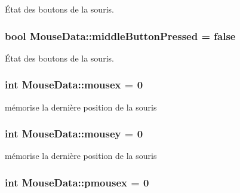 État des boutons de la souris. 

\hypertarget{class_mouse_data_a00962824d35b75221cc3198467cc8907}{
\subsubsection[{middle\+Button\+Pressed}]{\setlength{\rightskip}{0pt plus 5cm}bool Mouse\+Data\+::middle\+Button\+Pressed = false\hspace{0.3cm}{\ttfamily [static]}}}\label{class_mouse_data_a00962824d35b75221cc3198467cc8907}


État des boutons de la souris. 

\hypertarget{class_mouse_data_a97eb3138f2f52f859b0d16e683d8cfcb}{
\subsubsection[{mousex}]{\setlength{\rightskip}{0pt plus 5cm}int Mouse\+Data\+::mousex = 0\hspace{0.3cm}{\ttfamily [static]}}}\label{class_mouse_data_a97eb3138f2f52f859b0d16e683d8cfcb}


mémorise la dernière position de la souris 

\hypertarget{class_mouse_data_aea43f059e0ff26829a0a8d8619b3f18c}{
\subsubsection[{mousey}]{\setlength{\rightskip}{0pt plus 5cm}int Mouse\+Data\+::mousey = 0\hspace{0.3cm}{\ttfamily [static]}}}\label{class_mouse_data_aea43f059e0ff26829a0a8d8619b3f18c}


mémorise la dernière position de la souris 

\hypertarget{class_mouse_data_a7694431e993365b4817ff2e9ac161555}{
\subsubsection[{pmousex}]{\setlength{\rightskip}{0pt plus 5cm}int Mouse\+Data\+::pmousex = 0\hspace{0.3cm}{\ttfamily [static]}}}\label{class_mouse_data_a7694431e993365b4817ff2e9ac161555}


